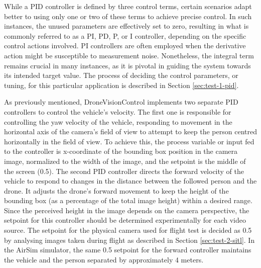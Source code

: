 While a PID controller is defined by three control terms, certain scenarios adapt better to using only one or two of these terms to achieve precise control. In such instances, the unused parameters are effectively set to zero, resulting in what is commonly referred to as a PI, PD, P, or I controller, depending on the specific control actions involved. PI controllers are often employed when the derivative action might be susceptible to measurement noise. Nonetheless, the integral term remains crucial in many instances, as it is pivotal in guiding the system towards its intended target value. The process of deciding the control parameters, or tuning, for this particular application is described in Section \ref{sec:test-1-pid}.

As previously mentioned, DroneVisionControl implements two separate PID controllers to control the vehicle's velocity.
The first one is responsible for controlling the yaw velocity of the vehicle, responding to movement in the horizontal axis of the camera's field of view to attempt to keep the person centred horizontally in the field of view. To achieve this, the process variable or input fed to the controller is x-coordinate of the bounding box position in the camera image, normalized to the width of the image, and the setpoint is the middle of the screen (0.5).
The second PID controller directs the forward velocity of the vehicle to respond to changes in the distance between the followed person and the drone. It adjusts the drone's forward movement to keep the height of the bounding box (as a percentage of the total image height) within a desired range. Since the perceived height in the image depends on the camera perspective, the setpoint for this controller should be determined experimentally for each video source. The setpoint for the physical camera used for flight test is decided as 0.5 by analysing images taken during flight as described in Section \ref{sec:test-2-sitl}. In the AirSim simulator, the same 0.5 setpoint for the forward controller maintains the vehicle and the person separated by approximately 4 meters.

